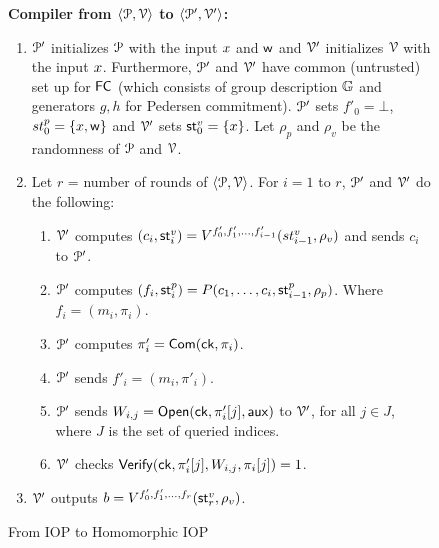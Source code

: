 \begin{figure}[h!]
	{\footnotesize
		\begin{framed}
			\noindent \textbf{Compiler from $\langle \mathcal{P},\mathcal{V}\rangle$ to $\langle \mathcal{P}',\mathcal{V}'\rangle$:}
			\begin{enumerate}[{\rm 1.}]
				\item $\mathcal{P}'$ initializes $\mathcal{P}$ with the input ${x}$ and $\mathsf{w}$ and $\mathcal{V}'$ initializes $\mathcal{V}$ with the input ${x}$. Furthermore, $\mathcal{P}'$ and $\mathcal{V}'$ have common (untrusted) set up for $\mathsf{FC}$ (which consists of group description $\mathbb{G}$ and generators $g, h$ for Pedersen commitment). 
				$\mathcal{P}'$ sets $f'_0 = \bot$, $st^p_0 = \{{x}, \mathsf{w}\}$ and $\mathcal{V}'$ sets $\mathsf{st}^v_0 = \{{x}\}$. Let $\rho_p$ and $\rho_v$ be the randomness of $\mathcal{P}$ and $\mathcal{V}$.
				\item Let $r$ = number of rounds of $\langle \mathcal{P},\mathcal{V}\rangle$.
				For $i = 1$ to $r$, $\mathcal{P}'$ and $\mathcal{V}'$ do the following: 
				\begin{enumerate}
					\item $\mathcal{V}'$ computes $(c_i,\mathsf{st}^v_i) = V^{f'_0, f'_1, \ldots, f'_{i-1}}(st^v_{i-1}, \rho_v)$ and sends $c_i$ to $\mathcal{P}'$.
					\item $\mathcal{P}'$ computes $(f_i,\mathsf{st}^p_i) = P(c_1, \ldots, c_{i}, \mathsf{st}^p_{i-1}, \rho_p)$. Where $f_i = (m_i, \pi_i)$.
					\item $\mathcal{P}'$ computes $\pi'_i = \mathsf{Com}(\mathsf{ck}, \pi_i)$. 
					\item $\mathcal{P}'$ sends $f'_i = (m_i, \pi'_i)$.
					\item $\mathcal{P}'$ sends $W_{i,j} = \mathsf{Open}(\mathsf{ck}, \pi'_i[j], \mathsf{aux})$ to $\mathcal{V}'$, for all $j\in J$, where $J$ is the set of queried indices.
					\item $\mathcal{V}'$ checks $\mathsf{Verify}(\mathsf{ck}, \pi'_i[j], W_{i,j}, \pi_i[j]) = 1$.
				\end{enumerate}
				\item $\mathcal{V}'$ outputs $b = V^{f'_0, f'_1, \ldots, f_r} ( \mathsf{st}^v_r , \rho_v)$.
			\end{enumerate}
		\end{framed}
		\caption{From IOP to Homomorphic IOP}
		\label{fig:homomorphicIOP}
	}
\end{figure}

